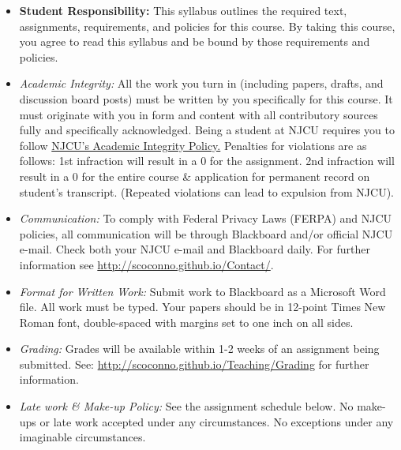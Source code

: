 \documentclass[article,oneside]{memoir}
\begin{document}
\begin{itemize}

\item \textbf{Student Responsibility:} This syllabus outlines the required text, assignments, requirements, and policies for this course. By taking this course, you agree to read this syllabus and be bound by those requirements and policies. 

 \item \textit{Academic Integrity:} All the work you turn in (including papers, drafts, and discussion board posts) must be written by you specifically for this course. It must originate with you in form and content with all contributory sources fully and specifically acknowledged. Being a student at NJCU requires you to follow \href{http://www.njcu.edu/uploadedFiles/About_NJCU/Governance_and_Organization/University_Senate/Policies/Academic\%20INTEGRITY\%20POLICY\%20FINAL\%202-04.pdf}{NJCU's Academic Integrity Policy.} Penalties for violations are as follows: 1st infraction will result in a 0 for the assignment.  2nd infraction will result in a 0 for the entire course \& application for permanent record on student's transcript. (Repeated violations can lead to expulsion from NJCU). 


\item \textit{Communication:} To comply with Federal Privacy Laws (FERPA) and NJCU policies, all communication will be through Blackboard and/or official NJCU e-mail. Check both your NJCU e-mail and Blackboard daily. For further information see \href{http://scoconno.github.io/Contact/}{http://scoconno.github.io/Contact/}.



\item \textit{Format for Written Work:} Submit work to Blackboard as a Microsoft Word file. All work must be typed. Your papers should be in 12-point Times New Roman font, double-spaced with margins set to one inch on all sides.



\item \textit{Grading:} Grades will be available within 1-2 weeks of an assignment being submitted. See: \href{http://scoconno.github.io/Teaching/Grading}{http://scoconno.github.io/Teaching/Grading} for further information.


\item \textit{Late work \& Make-up Policy:} See the assignment schedule below. No make-ups or late work accepted under any circumstances. No exceptions under any imaginable circumstances. 



\end{itemize}
\end{document}

